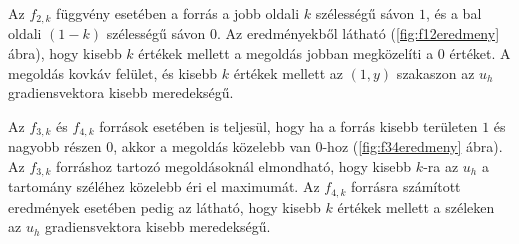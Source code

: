 Az $f_{2,k}$ függvény esetében a forrás a jobb oldali $k$ szélességű sávon $1$, és a bal oldali $(1-k)$ szélességű sávon $0$. Az eredményekből látható (\ref{fig:f12eredmeny} ábra), hogy  kisebb $k$ értékek mellett a megoldás jobban megközelíti a $0$ értéket. A megoldás kovkáv felület, és kisebb $k$ értékek mellett az  $(1,y)$ szakaszon az $u_h$ gradiensvektora kisebb meredekségű.



Az $f_{3,k}$ és $f_{4,k}$ források esetében is teljesül, hogy ha a forrás kisebb területen $1$ és nagyobb részen $0$, akkor a megoldás közelebb van $0$-hoz  (\ref{fig:f34eredmeny} ábra). Az $f_{3,k}$ forráshoz tartozó megoldásoknál elmondható, hogy kisebb $k$-ra az $u_h$ a tartomány széléhez közelebb éri el maximumát. Az $f_{4,k}$ forrásra számított eredmények esetében pedig az látható, hogy kisebb $k$ értékek mellett a  széleken az $u_h$ gradiensvektora kisebb meredekségű.

